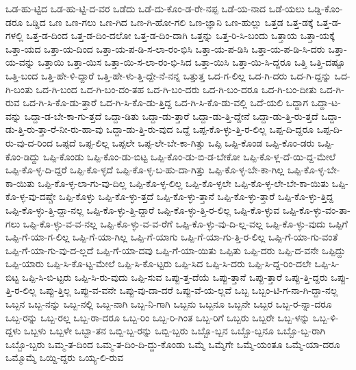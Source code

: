 {ಒಡ-ಹು-ಟ್ಟಿದ
ಒಡ-ಹು-ಟ್ಟಿ-ದ-ವರ
ಒಡೆದು
ಒಡೆ-ದು-ಕೊಂ-ಡ-ರೇ-ನಪ್ಪ
ಒಡೆ-ಯ-ನಾದ
ಒಡೆ-ಯಲು
ಒಡ್ಡಿ-ಕೊಂ-ಡರೂ
ಒಡ್ಡಿದ
ಒಣ
ಒಣ-ಗಲು
ಒಣ-ಗಿದ
ಒಣ-ಗಿ-ಹೋ-ಗಲಿ
ಒಣ-ಜ್ಞಾನಿ
ಒಣ-ಹುಲ್ಲು
ಒತ್ತಡ
ಒತ್ತ-ಡಕ್ಕೆ
ಒತ್ತ-ಡ-ಗಳಲ್ಲಿ
ಒತ್ತ-ಡ-ದಿಂದ
ಒತ್ತ-ಡ-ದಿಂ-ದಲೋ
ಒತ್ತ-ಡ-ದಿಂ-ದಾಗಿ
ಒತ್ತನ್ನು
ಒತ್ತ-ರಿ-ಸಿ-ಬಂದು
ಒತ್ತಾಯ
ಒತ್ತಾ-ಯಕ್ಕೆ
ಒತ್ತಾ-ಯದ
ಒತ್ತಾ-ಯ-ದಿಂದ
ಒತ್ತಾ-ಯ-ಪ-ಡಿ-ಸ-ಲಾ-ರಂ-ಭಿಸಿ
ಒತ್ತಾ-ಯ-ಪ-ಡಿಸಿ
ಒತ್ತಾ-ಯ-ಪ-ಡಿ-ಸಿ-ದರು
ಒತ್ತಾ-ಯ-ವನ್ನು
ಒತ್ತಾಯಿ
ಒತ್ತಾ-ಯಿಸ
ಒತ್ತಾ-ಯಿ-ಸ-ಲಾ-ರಂ-ಭಿ-ಸಿದ
ಒತ್ತಾ-ಯಿಸಿ
ಒತ್ತಾ-ಯಿ-ಸಿ-ದ್ದರೂ
ಒತ್ತಿ
ಒತ್ತಿ-ದಷ್ಟೂ
ಒತ್ತಿ-ಬಂದ
ಒತ್ತಿ-ಹೇ-ಳಿ-ದ್ದಾರೆ
ಒತ್ತಿ-ಹೇ-ಳು-ತ್ತಿ-ದ್ದೇ-ನೆ-ನನ್ನ
ಒತ್ತುತ್ತ
ಒದ-ಗ-ಲಿಲ್ಲ
ಒದ-ಗಿ-ದರು
ಒದ-ಗಿ-ದ್ದನ್ನು
ಒದ-ಗಿ-ಬಂತು
ಒದ-ಗಿ-ಬಂದ
ಒದ-ಗಿ-ಬಂ-ದಂ-ತಹ
ಒದ-ಗಿ-ಬಂ-ದರು
ಒದ-ಗಿ-ಬಂ-ದರೂ
ಒದ-ಗಿ-ಬಂ-ದೀತು
ಒದ-ಗಿ-ರುವ
ಒದ-ಗಿ-ಸಿ-ಕೊ-ಡು-ತ್ತಾರೆ
ಒದ-ಗಿ-ಸಿ-ಕೊ-ಡು-ತ್ತಿದ್ದ
ಒದ-ಗಿ-ಸಿ-ಕೊ-ಡು-ವಲ್ಲಿ
ಒದೆ-ಯಲಿ
ಒದ್ದಾಗ
ಒದ್ದಾ-ಟ-ವನ್ನು
ಒದ್ದಾ-ಡ-ಬೇ-ಕಾ-ಗು-ತ್ತದೆ
ಒದ್ದಾ-ಡಿತು
ಒದ್ದಾ-ಡು-ತ್ತಾರೆ
ಒದ್ದಾ-ಡು-ತ್ತಿ-ದ್ದೇನೆ
ಒದ್ದಾ-ಡು-ತ್ತಿ-ರು-ತ್ತದೆ
ಒದ್ದಾ-ಡು-ತ್ತಿ-ರು-ತ್ತಾ-ರೆ-ನೀ-ರು-ಹಾ-ವು
ಒದ್ದಾ-ಡು-ತ್ತಿ-ರು-ವುದ
ಒದ್ದೆ
ಒಪ್ಪ-ಕೊ-ಳ್ಳು-ತ್ತಿ-ರ-ಲಿಲ್ಲ
ಒಪ್ಪ-ದಿ-ದ್ದರೂ
ಒಪ್ಪ-ದಿ-ರು-ವು-ದ-ರಿಂದ
ಒಪ್ಪದೆ
ಒಪ್ಪ-ಲಿಲ್ಲ
ಒಪ್ಪಲೇ
ಒಪ್ಪ-ಲೇ-ಬೇ-ಕಾ-ಗಿತ್ತು
ಒಪ್ಪಿ
ಒಪ್ಪಿ-ಕೊಂಡ
ಒಪ್ಪಿ-ಕೊಂ-ಡರು
ಒಪ್ಪಿ-ಕೊಂ-ಡಿದ್ದು
ಒಪ್ಪಿ-ಕೊಂಡು
ಒಪ್ಪಿ-ಕೊಂ-ಡು-ಬಿಟ್ಟ
ಒಪ್ಪಿ-ಕೊಂ-ಡು-ಬಿ-ಡ-ಬೇಕೋ
ಒಪ್ಪಿ-ಕೊ-ಳ್ಲ-ದೆ-ಯಿ-ದ್ದ-ಮೇಲೆ
ಒಪ್ಪಿ-ಕೊ-ಳ್ಳ-ದಿ-ದ್ದರೆ
ಒಪ್ಪಿ-ಕೊ-ಳ್ಳದೆ
ಒಪ್ಪಿ-ಕೊ-ಳ್ಳ-ಬ-ಹು-ದಾ-ಗಿತ್ತು
ಒಪ್ಪಿ-ಕೊ-ಳ್ಳ-ಬೇ-ಕಾ-ಗಿಲ್ಲ
ಒಪ್ಪಿ-ಕೊ-ಳ್ಳ-ಬೇ-ಕಾ-ಯಿತು
ಒಪ್ಪಿ-ಕೊ-ಳ್ಳ-ಲಾ-ಗು-ವು-ದಿಲ್ಲ
ಒಪ್ಪಿ-ಕೊ-ಳ್ಳ-ಲಿಲ್ಲ
ಒಪ್ಪಿ-ಕೊ-ಳ್ಳಲೇ
ಒಪ್ಪಿ-ಕೊ-ಳ್ಳ-ಲೇ-ಬೇ-ಕಾ-ಯಿತು
ಒಪ್ಪಿ-ಕೊ-ಳ್ಳ-ವು-ದಷ್ಚೇ
ಒಪ್ಪಿ-ಕೊಳ್ಳು
ಒಪ್ಪಿ-ಕೊ-ಳ್ಳು-ತ್ತದೆ
ಒಪ್ಪಿ-ಕೊ-ಳ್ಳು-ತ್ತಾನೆ
ಒಪ್ಪಿ-ಕೊ-ಳ್ಳು-ತ್ತಾರೆ
ಒಪ್ಪಿ-ಕೊ-ಳ್ಳು-ತ್ತಿದ್ದ
ಒಪ್ಪಿ-ಕೊ-ಳ್ಳು-ತ್ತಿ-ದ್ದಾ-ನಲ್ಲ
ಒಪ್ಪಿ-ಕೊ-ಳ್ಳು-ತ್ತಿ-ದ್ದಾರೆ
ಒಪ್ಪಿ-ಕೊ-ಳ್ಳು-ತ್ತಿ-ರ-ಲಿಲ್ಲ
ಒಪ್ಪಿ-ಕೊ-ಳ್ಳುವ
ಒಪ್ಪಿ-ಕೊ-ಳ್ಳು-ವಂ-ತಾ-ಗಲು
ಒಪ್ಪಿ-ಕೊ-ಳ್ಳು-ವ-ವ-ನಲ್ಲ
ಒಪ್ಪಿ-ಕೊ-ಳ್ಳು-ವ-ವ-ರೆಗೆ
ಒಪ್ಪಿ-ಕೊ-ಳ್ಳು-ವು-ದಿ-ಲ್ಲ-ವಲ್ಲ
ಒಪ್ಪಿ-ಕೊ-ಳ್ಳು-ವುದು
ಒಪ್ಪಿಗೆ
ಒಪ್ಪಿ-ಗೆ-ಯಾ-ಗ-ಲಿಲ್ಲ
ಒಪ್ಪಿ-ಗೆ-ಯಾ-ಗಿಲ್ಲ
ಒಪ್ಪಿ-ಗೆ-ಯಾಗು
ಒಪ್ಪಿ-ಗೆ-ಯಾ-ಗು-ತ್ತಿ-ರ-ಲಿಲ್ಲ
ಒಪ್ಪಿ-ಗೆ-ಯಾ-ಗು-ವಂತೆ
ಒಪ್ಪಿ-ಗೆ-ಯಾ-ಗು-ವು-ದ-ಲ್ಲದೆ
ಒಪ್ಪಿ-ಗೆ-ಯಾ-ದವು
ಒಪ್ಪಿ-ಗೆ-ಯಾ-ಯಿತು
ಒಪ್ಪಿತು
ಒಪ್ಪಿ-ದರು
ಒಪ್ಪಿ-ದ-ವನೇ
ಒಪ್ಪಿದ್ದು
ಒಪ್ಪಿ-ಯಾರು
ಒಪ್ಪಿ-ಸಿ-ಕೊ-ಟ್ಟ-ಮೇಲೆ
ಒಪ್ಪಿ-ಸಿ-ಕೊ-ಟ್ಟರು
ಒಪ್ಪಿ-ಸಿದ
ಒಪ್ಪಿ-ಸಿ-ದರು
ಒಪ್ಪಿ-ಸಿ-ದ್ದ-ರಿಂ-ದಲೇ
ಒಪ್ಪಿ-ಸಿ-ಬಿಟ್ಟ
ಒಪ್ಪಿ-ಸಿ-ಬಿ-ಟ್ಟರು
ಒಪ್ಪಿ-ಸಿ-ರು-ವುದು
ಒಪ್ಪಿ-ಸುವ
ಒಪ್ಪು-ತ್ತ-ದೆಯೆ
ಒಪ್ಪು-ತ್ತಾನೆ
ಒಪ್ಪು-ತ್ತಾರೆ
ಒಪ್ಪು-ತ್ತಿ-ದ್ದರು
ಒಪ್ಪು-ತ್ತಿ-ರ-ಲಿಲ್ಲ
ಒಪ್ಪು-ತ್ತಿಲ್ಲ
ಒಪ್ಪು-ವ-ವನೇ
ಒಪ್ಪು-ವು-ದಾ-ದರೆ
ಒಪ್ಪು-ವೆ-ಯ-ಲ್ಲವೆ
ಒಬ್ಬ
ಒಬ್ಬಂ-ಟಿ-ಗ-ನಾ-ಗಿ-ದ್ದಾ-ನಲ್ಲ
ಒಬ್ಬನ
ಒಬ್ಬ-ನನ್ನು
ಒಬ್ಬ-ನಲ್ಲಿ
ಒಬ್ಬ-ನಾಗಿ
ಒಬ್ಬ-ನಿ-ಗಾಗಿ
ಒಬ್ಬನು
ಒಬ್ಬನೂ
ಒಬ್ಬನೇ
ಒಬ್ಬರ
ಒಬ್ಬ-ರ-ನ್ನಾ-ದರೂ
ಒಬ್ಬ-ರನ್ನು
ಒಬ್ಬ-ರಲ್ಲ
ಒಬ್ಬ-ರಾ-ದರೂ
ಒಬ್ಬ-ರಿಂ
ಒಬ್ಬ-ರಿ-ಗಿಂತ
ಒಬ್ಬ-ರಿಗೆ
ಒಬ್ಬರು
ಒಬ್ಬರೇ
ಒಬ್ಬ-ಳನ್ನು
ಒಬ್ಬ-ಳಿ-ದ್ದಳು
ಒಬ್ಬಳು
ಒಬ್ಬಳೇ
ಒಬ್ಬಾ-ತನ
ಒಬ್ಬಿ-ಬ್ಬ-ರನ್ನು
ಒಬ್ಬಿ-ಬ್ಬರು
ಒಬ್ಬೊ-ಬ್ಬನ
ಒಬ್ಬೊ-ಬ್ಬನೂ
ಒಬ್ಬೊ-ಬ್ಬ-ರಾಗಿ
ಒಬ್ಬೊ-ಬ್ಬರು
ಒಮ್ಮ-ತ-ದಿಂದ
ಒಮ್ಮ-ತ-ದಿಂ-ದಿ-ದ್ದು-ಕೊಂಡು
ಒಮ್ಮೆ
ಒಮ್ಮೆಗೇ
ಒಮ್ಮೆ-ಯಂತೂ
ಒಮ್ಮೆ-ಯಾ-ದರೂ
ಒಮ್ಮೊಮ್ಮೆ
ಒಯ್ದಿ-ದ್ದರು
ಒಯ್ಯ-ಲಿ-ರುವ
}
